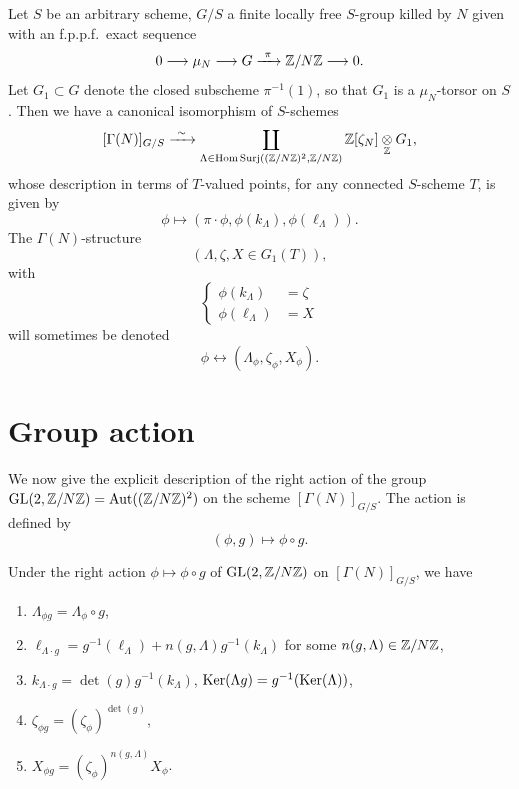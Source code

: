 \begin{kcor}\label{cor:10.2.5}
Let $S$ be an arbitrary scheme, $G/S$ a finite locally free $S$-group killed by $N$ given with an f.p.p.f.\ exact sequence
\[
0 \longrightarrow \mu_N \longrightarrow G \xrightarrow{\ \pi\ } \mathbb{Z}/N\mathbb{Z} \longrightarrow 0 .
\]
Let $G_1 \subset G$ denote the closed subscheme $\pi^{-1}(1)$, so that $G_1$ is a $\mu_N$-torsor on $S$. Then we have a canonical isomorphism of $S$-schemes
\[
[\Gamma(N)]_{G/S} \xrightarrow{\ \sim\ } \coprod_{\Lambda \in \mathrm{Hom\,Surj}((\mathbb{Z}/N\mathbb{Z})^2, \mathbb{Z}/N\mathbb{Z})} \mathbb{Z}[\zeta_N] \underset{\mathbb{Z}}{\otimes} G_1 ,
\]
whose description in terms of $T$-valued points, for any connected $S$-scheme $T$, is given by
\[
\phi \mapsto (\pi \cdot \phi, \phi(k_\Lambda), \phi(\ell_\Lambda)) .
\]
The $\Gamma(N)$-structure
\[
(\Lambda, \zeta, X \in G_1(T)) ,
\]
with
\[
\left\{\begin{aligned}
\phi(k_\Lambda) & = \zeta \\
\phi(\ell_\Lambda) & = X
\end{aligned}\right.
\]
will sometimes be denoted
\[
\phi \leftrightarrow (\Lambda_\phi, \zeta_\phi, X_\phi) .
\]
\end{kcor}

\section{Group action}
\label{sec:10.3}

We now give the explicit description of the right action of the group $\operatorname{GL}(2,\mathbb{Z}/N\mathbb{Z}) = \operatorname{Aut}((\mathbb{Z}/N\mathbb{Z})^2)$ on the scheme $[\Gamma(N)]_{G/S}$. The action is defined by
\begin{equation}\label{eq:10.3.1}
(\phi, g) \mapsto \phi \circ g .
\end{equation}

\addtocounter{kmitem}{1}

\begin{klem}\label{lem:10.3.2}
Under the right action $\phi \mapsto \phi \circ g$ of $\operatorname{GL}(2,\mathbb{Z}/N\mathbb{Z})$ on $[\Gamma(N)]_{G/S}$, we have
\begin{enumerate}[label=(\arabic*)]
\item $\Lambda_{\phi g} = \Lambda_\phi \circ g$,
\item $\ell_{\Lambda \cdot g} = g^{-1}(\ell_\Lambda) + n(g,\Lambda) g^{-1}(k_\Lambda)$ for some $n(g,\Lambda) \in \mathbb{Z}/N\mathbb{Z}$,
\item $k_{\Lambda \cdot g} = \det(g) g^{-1}(k_\Lambda)$, $\operatorname{Ker}(\Lambda g) = g^{-1}(\operatorname{Ker}(\Lambda))$,
\item $\zeta_{\phi g} = (\zeta_\phi)^{\det(g)}$,
\item $X_{\phi g} = (\zeta_\phi)^{n(g,\Lambda)} X_\phi$.
\end{enumerate}
\end{klem}

